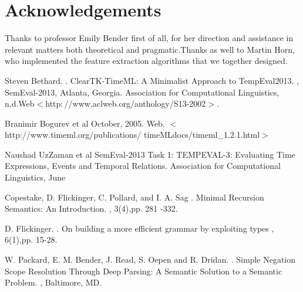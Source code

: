 \documentclass[11pt]{article}
\begin{document}
\section{Acknowledgements}
Thanks to professor Emily Bender first of all, for her direction and assistance in relevant matters both theoretical and pragmatic.Thanks as well to Martin Horn, who implemented the feature extraction algorithms that we together designed.
%
%


	\begin{thebibliography}{}

		Steven Bethard.
		.
		\newblock ClearTK-TimeML: A Minimalist Approach to TempEval2013.
		,
		SemEval-2013, Atlanta, Georgia. Association for Computational Linguistics, n.d.Web$<$http$:$//www.aclweb.org/anthology/S13-2002$>$.

		Branimir Bogurev et al
		\newblock October, 2005. Web. $<$http://www.timeml.org/publications/
		\newblock timeMLdocs/timeml\_1.2.1.html$>$

		Naushad UzZaman et al
		\newblock SemEval-2013 Task 1: TEMPEVAL-3: Evaluating Time Expressions, Events and Temporal Relations.
		 			\newblock Association for Computational Linguistics, June


		Copestake, D. Flickinger, C. Pollard, and I. A. Sag
		.
		\newblock Minimal Recursion Semantics: An Introduction.
		,
		3(4),pp. 281 -332.

		D. Flickinger.
		.
		\newblock On building a more efficient grammar by exploiting types
		,
		6(1),pp. 15-28.
		
		W. Packard, E. M. Bender, J. Read, S. Oepen and R. Dridan.
		.
		\newblock Simple Negation Scope Resolution
Through Deep Parsing: A Semantic Solution to a
Semantic Problem.
		,
		Baltimore, MD.

	\end{thebibliography}
\end{document}
